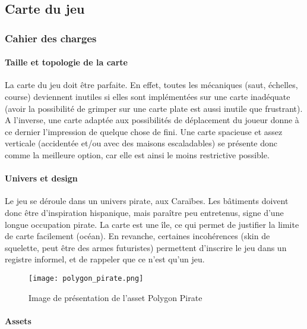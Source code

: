 \subsection{Carte du jeu}

\subsubsection{Cahier des charges}

    \paragraph{Taille et topologie de la carte}
        
        La carte du jeu doit être parfaite. En effet, toutes les mécaniques 
        (saut, échelles, course)
        deviennent inutiles si elles sont implémentées sur une carte inadéquate (avoir la 
        possibilité de grimper sur une carte plate est aussi inutile que frustrant).
        A l'inverse, une carte adaptée aux possibilités de déplacement du joueur donne à ce dernier
        l'impression de quelque chose de fini.
        Une carte spacieuse et assez verticale (accidentée et/ou avec des maisons escaladables)
        se présente donc comme la meilleure option, car elle est ainsi le moins restrictive possible.


    \paragraph{Univers et design}

        Le jeu se déroule dans un univers pirate, aux Caraïbes.
        Les bâtiments doivent donc être d'inspiration hispanique,
        mais paraître peu entretenus, signe d'une longue occupation 
        pirate. La carte est une île, ce qui permet de justifier
        la limite de carte facilement (océan). En revanche, certaines 
        incohérences (skin de squelette, peut être des armes futuristes)
        permettent d'inscrire le jeu dans un registre informel, et de 
        rappeler que ce n'est qu'un jeu.
        \\

        \begin{figure}[!hbt]
            \centering
            \texttt{[image: polygon\_pirate.png]}
            \caption{Image de présentation de l'asset Polygon Pirate}
        \end{figure}


    \paragraph{Assets}

